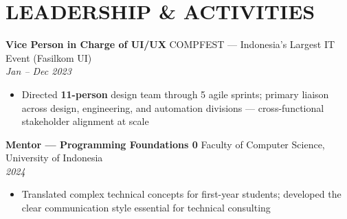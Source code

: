 \documentclass[10pt,a4paper]{article}
\newcommand{\experienceheader}[4]{
    \textbf{#1} \hfill #2 \\
    \textit{#3} \hfill \textit{#4}
}
\begin{document}
\vspace{-5pt}

\section*{LEADERSHIP \& ACTIVITIES}

\experienceheader{Vice Person in Charge of UI/UX}{COMPFEST --- Indonesia's Largest IT Event (Fasilkom UI)}{}{Jan -- Dec 2023}
\begin{itemize}[leftmargin=*, itemsep=0.5pt, topsep=0.5pt]
    \item Directed \textbf{11-person} design team through 5 agile sprints; primary liaison across design, engineering, and automation divisions --- cross-functional stakeholder alignment at scale
\end{itemize}

\vspace{1pt}

\experienceheader{Mentor --- Programming Foundations 0}{Faculty of Computer Science, University of Indonesia}{}{2024}
\begin{itemize}[leftmargin=*, itemsep=0.5pt, topsep=0.5pt]
    \item Translated complex technical concepts for first-year students; developed the clear communication style essential for technical consulting
\end{itemize}
\end{document}
